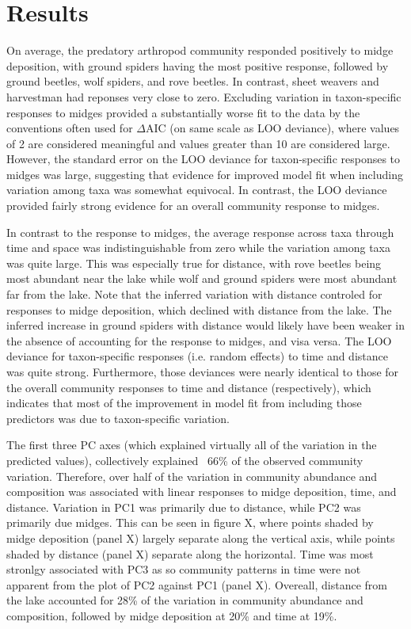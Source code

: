 

\section*{Results}

On average, the predatory arthropod community responded positively to midge deposition, with ground spiders having the most positive
response, followed by ground beetles, wolf spiders, and rove beetles. In contrast, sheet  weavers and harvestman had reponses
very close to zero. Excluding variation in taxon-specific responses to midges provided a substantially worse fit to the data by the
conventions often used for $\Delta$AIC (on same scale as LOO deviance), where values of 2 are considered meaningful and values
greater than 10 are considered large. However, the standard error on the LOO deviance for taxon-specific responses to midges was
large, suggesting that evidence for improved model fit when including variation among taxa was somewhat equivocal. In contrast, the
LOO deviance provided fairly strong evidence for an overall community response to midges.

In contrast to the response to midges, the average response across taxa through time and space was indistinguishable from zero while
the variation among taxa was quite large. This was especially true for distance, with rove beetles being most abundant near the lake
while wolf and ground spiders were most abundant far from the lake. Note that the inferred variation with distance controled for
responses to midge deposition, which declined with distance from the lake. The inferred increase in ground spiders with distance
would likely have been weaker in the absence of accounting for the response to midges, and visa versa. The LOO deviance for
taxon-specific responses (i.e. random effects) to time and distance was quite strong. Furthermore, those deviances were nearly
identical to those for the overall community responses to time and distance (respectively), which indicates that most of the
improvement in model fit from including those predictors was due to taxon-specific variation.

The first three PC axes (which explained virtually all of the variation in the predicted values), collectively explained ~66\% of the
observed community variation. Therefore, over half of the variation in community abundance and composition was associated with
linear responses to midge deposition, time, and distance. Variation in PC1 was primarily due to distance, while PC2 was primarily due
midges. This can be seen in figure X, where points shaded by midge deposition (panel X) largely separate along the vertical axis,
while points shaded by distance (panel X) separate along the horizontal. Time was most stronlgy associated with PC3 as so community
patterns in time were not apparent from the plot of PC2 against PC1 (panel X). Overeall, distance from the lake accounted for 28\% of
the variation in community abundance and composition, followed by midge deposition at 20\% and time at 19\%.

